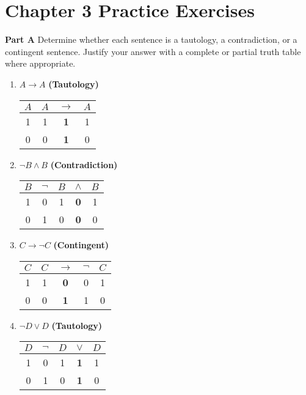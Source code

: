 \documentclass[12pt, letterpaper, twoside]{article}
\newcommand*{\TTon}{\hspace{1.5em}\extracolsep{-1em}}
\newcommand*{\TToff}{\extracolsep{-1em}\hspace{.3em}}
\newcommand*{\TTbf}[1]{\textbf{\large #1}}
\begin{document}
\section{Chapter 3 Practice Exercises}

\noindent \textbf{Part A} Determine whether each sentence is
a tautology, a contradiction, or a contingent
sentence. Justify your answer with a complete or partial
truth table where appropriate.
\begin{enumerate}
	\item $A \rightarrow A$ \textbf{(Tautology)}
	
	\begin{center}
	\begin{tabular}{c|@{\TTon}*{3}{c}@{\TToff}}
	$A$ & $A$ & $\rightarrow$ & $A$ \\ \hline 1 & 1 &
          \TTbf{1} & 1 \\ 0 & 0 & \TTbf{1} & 0
	\end{tabular}
	\end{center}
	
	\item $\neg B \wedge B$ \textbf{(Contradiction)}
	
	\begin{center}
	\begin{tabular}{c|@{\TTon}*{4}{c}@{\TToff}}
	$B$ & $\neg$ & $B$ & $\wedge$ & $B$ \\ \hline 1 & 0
          & 1 & \TTbf{0} & 1 \\ 0 & 1 & 0 & \TTbf{0} & 0
	\end{tabular}
	\end{center}
	
	\item $C \rightarrow\neg C$ \textbf{(Contingent)}
	
	\begin{center}
	\begin{tabular}{c|@{\TTon}*{4}{c}@{\TToff}}
	$C$ & $C$ & $\rightarrow$ & $\neg$ & $C$ \\ \hline 1
          & 1 & \TTbf{0} & 0 & 1 \\ 0 & 0 & \TTbf{1} & 1 & 0
	\end{tabular}
	\end{center}
	
	\item $\neg D \vee D$ \textbf{(Tautology)}
	
	\begin{center}
	\begin{tabular}{c|@{\TTon}*{4}{c}@{\TToff}}
	$D$ & $\neg$ & $D$ & $\vee$ & $D$ \\ \hline 1 & 0 &
          1 & \TTbf{1} & 1 \\ 0 & 1 & 0 & \TTbf{1} & 0
	\end{tabular}
	\end{center}
	

\end{enumerate}
\end{document}
